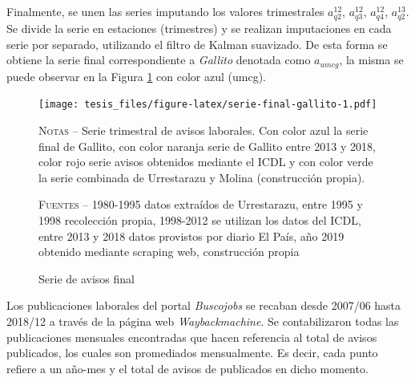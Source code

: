 \documentclass[12pt,oneside]{reedthesis}
\begin{document}
Finalmente, se unen las series imputando los valores trimestrales \(a_{q2}^{12}\), \(a_{q3}^{12}\), \(a_{q4}^{12}\), \(a_{q2}^{13}\). Se divide la serie en estaciones (trimestres) y se realizan imputaciones en cada serie por separado, utilizando el filtro de Kalman suavizado. De esta forma se obtiene la serie final correspondiente a \emph{Gallito} denotada como \(a_{umcg}\), la misma se puede observar en la Figura \ref{fig:serie-final-gallito} con color azul (umcg).
\begin{figure}
\texttt{[image: tesis\_files/figure-latex/serie-final-gallito-1.pdf]}
\caption{Serie de avisos final}\label{fig:serie-final-gallito}\textsc{}

\footnotesize\textsc{Notas} -- Serie trimestral de avisos laborales. Con color azul la serie final de Gallito, con color naranja serie de Gallito entre 2013 y 2018, color rojo serie avisos obtenidos mediante el ICDL y con color verde la serie combinada de Urrestarazu y Molina (construcción propia).

\textsc{Fuentes} -- 1980-1995 datos extraídos de Urrestarazu, entre 1995 y 1998 recolección propia, 1998-2012 se utilizan los datos del ICDL, entre 2013 y 2018 datos provistos por diario El País, año 2019 obtenido mediante scraping web, construcción propia
\end{figure}
Los publicaciones laborales del portal \emph{Buscojobs} se recaban desde 2007/06 hasta 2018/12 a través de la página web \emph{Waybackmachine}. Se contabilizaron todas las publicaciones mensuales encontradas que hacen referencia al total de avisos publicados, los cuales son promediados mensualmente. Es decir, cada punto refiere a un año-mes y el total de avisos de publicados en dicho momento.
\end{document}
